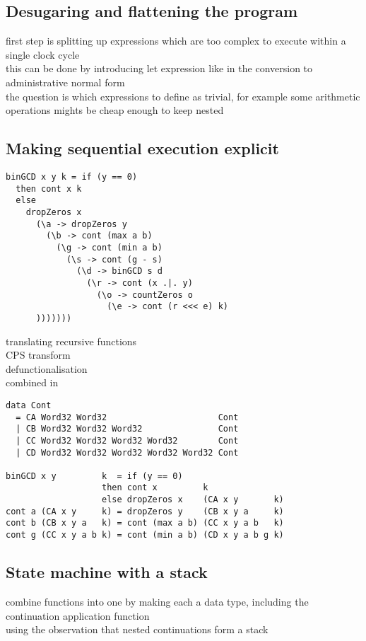 \documentclass[preprint]{sigplanconf}
\def\codefamily{\sffamily\normalsize}
\def\codesmall{\sffamily\small}
\begin{document}
\subsection{Desugaring and flattening the program}
first step is splitting up expressions which are too complex to execute within a single clock cycle \\
this can be done by introducing let expression like in the conversion to administrative normal form \cite{ANF} \\
the question is which expressions to define as trivial, for example some arithmetic operations mights be cheap enough to keep nested \\


\subsection{Making sequential execution explicit}
\begin{lstlisting}
binGCD x y k = if (y == 0)
  then cont x k
  else
    dropZeros x
      (\a -> dropZeros y
        (\b -> cont (max a b)
          (\g -> cont (min a b)
            (\s -> cont (g - s)
              (\d -> binGCD s d
                (\r -> cont (x .|. y)
                  (\o -> countZeros o
                    (\e -> cont (r <<< e) k)
      )))))))
\end{lstlisting}

translating recursive functions \cite{Ingmar} \cite{Zhai} \\
CPS transform \cite{AppelCwC} \\
defunctionalisation \cite{Reynolds} \\
combined in \cite{CCC}

\lstset{basicstyle=\codesmall}
\begin{lstlisting}
data Cont
  = CA Word32 Word32                      Cont
  | CB Word32 Word32 Word32               Cont
  | CC Word32 Word32 Word32 Word32        Cont
  | CD Word32 Word32 Word32 Word32 Word32 Cont

binGCD x y         k  = if (y == 0)
                   then cont x         k
                   else dropZeros x    (CA x y       k)
cont a (CA x y     k) = dropZeros y    (CB x y a     k)
cont b (CB x y a   k) = cont (max a b) (CC x y a b   k)
cont g (CC x y a b k) = cont (min a b) (CD x y a b g k)
\end{lstlisting}
\lstset{basicstyle=\codefamily}

\subsection{State machine with a stack}
combine functions into one by making each a data type, including the continuation application function \\
using the observation that nested continuations form a stack
\end{document}
